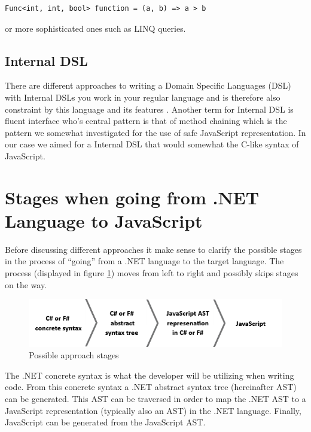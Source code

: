 			\begin{lstlisting}[language=CSharp,classoffset=1,morekeywords={Func}]
				Func<int, int, bool> function = (a, b) => a > b
			\end{lstlisting}

			or more sophisticated ones such as LINQ queries. 

	\subsection{Internal DSL} %
	\label{ssub:internal_dsl}
		There are different approaches to writing a Domain Specific Languages (DSL) with Internal DSLs you work in your regular language and is therefore also constraint by this language and its features \cite{domain_specific_languages}. Another term for Internal DSL is fluent interface who's central pattern is that of method chaining which is the pattern we somewhat investigated for the use of safe JavaScript representation. In our case we aimed for a Internal DSL that would somewhat the C-like syntax of JavaScript.

\section{Stages when going from .NET Language to JavaScript} %
\label{sec:stages_when_going_from_net_language_to_javascript}
	Before discussing different approaches it make sense to clarify the possible stages in the process of ``going'' from a .NET language to the target language. The process (displayed in figure \ref{stages}) moves from left to right and possibly skips stages on the way.

				\begin{figure}[H]
			\begin{center}
				\centerline{\includegraphics[width=14cm]{resources/images/stages.png}}
			\end{center}
			\caption{Possible approach stages}
			\label{stages}
		\end{figure}

	The .NET concrete syntax is what the developer will be utilizing when writing code. From this concrete syntax a .NET abstract syntax tree (hereinafter AST) can be generated. This AST can be traversed in order to map the .NET AST to a JavaScript representation (typically also an AST) in the .NET language. Finally, JavaScript can be generated from the JavaScript AST.

